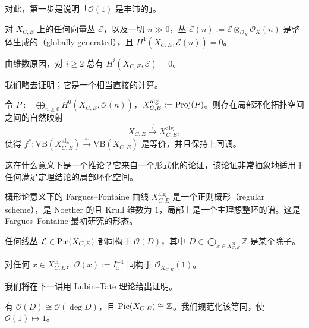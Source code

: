 对此，第一步是说明「$\mathcal{O}(1)$ 是丰沛的」。

\begin{theorem}
对 $X_{C,E}$ 上的任何向量丛 $\mathcal{E}$，以及一切 $n\gg0$，丛 $\mathcal{E}(n):=\mathcal{E}\otimes_{\mathcal{O}_X}\mathcal{O}_X(n)$ 是整体生成的（globally generated），且 $H^1(X_{C,E},\mathcal{E}(n))=0$。
\end{theorem}

\begin{remark}
由维数原因，对 $i\ge2$ 总有 $H^i(X_{C,E},\mathcal{E})=0$。
\end{remark}

我们略去证明；它是一个相当直接的计算。

\begin{corollary}[GAGA]
令 $P:=\bigoplus_{n\ge0}H^0(X_{C,E},\mathcal{O}(n))$，$X^{\mathrm{alg}}_{C,E}:=\operatorname{Proj}(P)$。则存在局部环化拓扑空间之间的自然映射
\[
X_{C,E}\xrightarrow{\ f\ }X^{\mathrm{alg}}_{C,E},
\]
使得 $f^*\colon\mathrm{VB}(X^{\mathrm{alg}}_{C,E})\xrightarrow{\sim}\mathrm{VB}(X_{C,E})$ 是等价，并且保持上同调。
\end{corollary}

这在什么意义下是一个推论？它来自一个形式化的论证，该论证非常抽象地适用于任何满足定理结论的局部环化空间。

\begin{remark}
概形论意义下的 Fargues--Fontaine 曲线 $X^{\mathrm{alg}}_{C,E}$ 是一个正则概形（regular scheme），是 Noether 的且 Krull 维数为 $1$，局部上是一个主理想整环的谱。这是 Fargues--Fontaine 最初研究的形态。
\end{remark}

\begin{corollary}
任何线丛 $\mathcal{L}\in\operatorname{Pic}(X_{C,E})$ 都同构于 $\mathcal{O}(D)$，其中 $D\in\bigoplus_{x\in X^{\mathrm{cl}}_{C,E}}\mathbb{Z}$ 是某个除子。
\end{corollary}

\begin{proposition}
对任何 $x\in X^{\mathrm{cl}}_{C,E}$，$\mathcal{O}(x):=I_x^{-1}$ 同构于 $\mathcal{O}_{X_{C,E}}(1)$。
\end{proposition}

我们将在下一讲用 Lubin--Tate 理论给出证明。

\begin{corollary}
有 $\mathcal{O}(D)\cong\mathcal{O}(\deg D)$，且 $\operatorname{Pic}(X_{C,E})\cong\mathbb{Z}$。我们规范化该等同，使 $\mathcal{O}(1)\mapsto1$。
\end{corollary}

